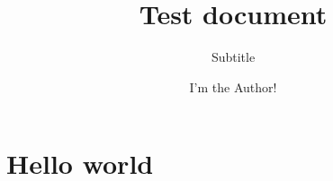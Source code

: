 \documentclass[]{article}
\title{Test document}
\subtitle{Subtitle}
\author{I'm the Author!}
\begin{document}
\maketitle
\section{Hello world}
\end{document}
